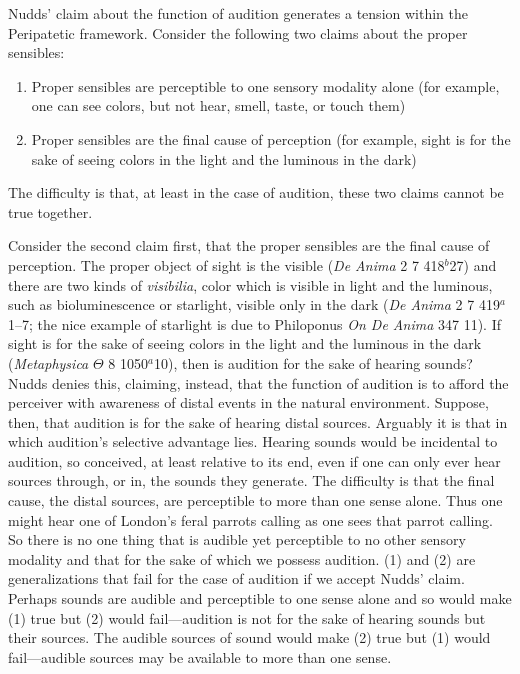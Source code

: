 Nudds' claim about the function of audition generates a tension within the Peripatetic framework. Consider the following two claims about the proper sensibles:
\begin{enumerate}[(1)]
	\item Proper sensibles are perceptible to one sensory modality alone (for example, one can see colors, but not hear, smell, taste, or touch them)
	\item Proper sensibles are the final cause of perception (for example, sight is for the sake of seeing colors in the light and the luminous in the dark)
\end{enumerate}
The difficulty is that, at least in the case of audition, these two claims cannot be true together.

Consider the second claim first, that the proper sensibles are the final cause of perception. The proper object of sight is the visible (\emph{De Anima} 2 7 418\( ^{b} \)27) and there are two kinds of \emph{visibilia}, color which is visible in light and the luminous, such as bioluminescence or starlight, visible only in the dark (\emph{De Anima} 2 7 419\( ^{a} \)1--7; the nice example of starlight is due to Philoponus  \emph{On \emph{De Anima}} 347 11). If sight is for the sake of seeing colors in the light and the luminous in the dark (\emph{Metaphysica} \( \Theta \) 8 1050\( ^{a} \)10), then is audition for the sake of hearing sounds? Nudds denies this, claiming, instead, that the function of audition is to afford the perceiver with awareness of distal events in the natural environment. Suppose, then, that audition is for the sake of hearing distal sources. Arguably it is that in which audition's selective advantage lies. Hearing sounds would be incidental to audition, so conceived, at least relative to its end, even if one can only ever hear sources through, or in, the sounds they generate. The difficulty is that the final cause, the distal sources, are perceptible to more than one sense alone. Thus one might hear one of London's feral parrots calling as one sees that parrot calling. So there is no one thing that is audible yet perceptible to no other sensory modality and that for the sake of which we possess audition. (1) and (2) are generalizations that fail for the case of audition if we accept Nudds' claim. Perhaps sounds are audible and perceptible to one sense alone and so would make (1) true but (2) would fail---audition is not for the sake of hearing sounds but their sources. The audible sources of sound would make (2) true but (1) would fail---audible sources may be available to more than one sense.

